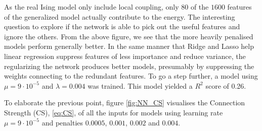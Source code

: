 As the real Ising model only include local coupling, only $80$ of the $1600$ features of the generalized model actually contribute to the energy. The interesting question to explore if the network is able to pick out the useful features and ignore the others. From the above figure, we see that the more heavily penalised models perform generally better. In the same manner that Ridge and Lasso help linear regression suppress features of less importance and reduce variance, the regularizing the network produces better models, presumably by suppressing the weights connecting to the redundant features. To go a step further, a model using $\mu = 9 \cdot 10^{-5}$ and $\lambda = 0.004$ was trained. This model yielded a $R^2$ score of 0.26. 

To elaborate the previous point, figure \autoref{fig:NN_CS} visualises the Connection Strength (CS), \autoref{eq:CS}, of all the inputs for models using learning rate $\mu = 9 \cdot 10^{-5}$ and penalties $0.0005$, $0.001$, $0.002$ and $0.004$. 

